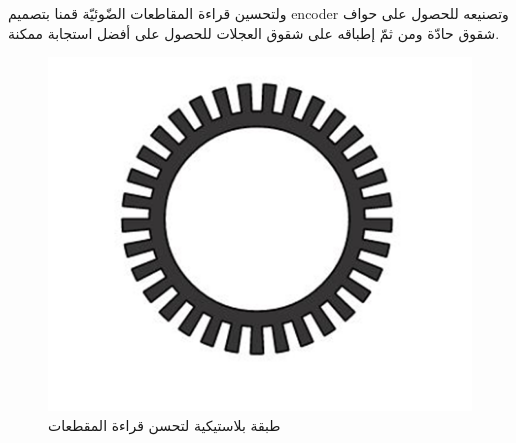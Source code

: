 ولتحسين قراءة المقاطعات الضّوئيّة قمنا بتصميم encoder وتصنيعه للحصول على حواف شقوق حادّة ومن ثمّ إطباقه على شقوق العجلات للحصول على أفضل استجابة ممكنة.

\begin{figure}
	\centering
	\includegraphics[width=0.5\linewidth]{figs/15/fig15_enc4}
	\caption{طبقة بلاستيكية لتحسن قراءة المقطعات}
	\label{fig:fig15enc4}
\end{figure}
